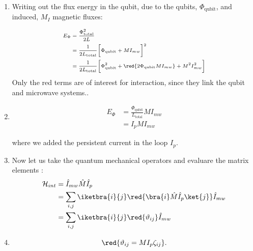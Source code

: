 \begin{minipage}{0.5\linewidth}%
  \begin{enumerate}%
  \item Writing out the  flux energy in the qubit, due to the  qubits, $ \Phi_\text{qubit} $,
    and induced, $ M_I $ magnetic fluxes:

    \begin{equation}\label{eq:couple8}{\scriptsize
      \begin{aligned}
        E_\Phi &= \frac{\Phi_\text{total}^2}{2L}\\
        & = \frac{1}{2L_{\text{total}}}\bigg[\Phi_\text{qubit} + MI_{mw}\bigg]^2\\
        &        =       \frac{1}{2L_\text{total}}\bigg[\Phi_\text{qubit}^2        +
        \red{2\Phi_\text{qubit}MI_{mw}} + M^2I_{mw}^2\bigg]
      \end{aligned}}
  \end{equation}
  \noindent Only the red terms are of interest for interaction, since they link the qubit and
  microwave systems..

\item \begin{equation}\label{eq:couple9}
    \begin{aligned}
      E_\Phi &= \frac{\Phi_\text{qubit}}{L_\text{total}}MI_{mw}\\
      & = I_pMI_{mw}
    \end{aligned}
  \end{equation}

  \noindent where we added the persistent current in the loop $ I_p $.

\item Now  let us  take the  quantum mechanical  operators and  evaluare the  matrix elements
  \cite{Astafiev2010}:
  \begin{equation}\label{eqn:dipole_1}
    \begin{aligned}
      \mathcal{H}_{int} & = \hat{I}_{mw}\hat{M}\hat{I}_p\\
      & = \sum_{i,j}\iketbra{i}{j}\red{\bra{i}\hat{M}\hat{I}_p\ket{j}} \hat{I}_{mw}\\
      & = \sum_{i,j}\iketbra{i}{j}\red{\vartheta_{ij}} \hat{I}_{mw}\\
    \end{aligned}
  \end{equation}

\item \begin{equation}\label{eq:couple10} \red{\vartheta_{ij} = MI_p\zeta_{ij}}.
  \end{equation}


\end{enumerate}
\end{minipage}
